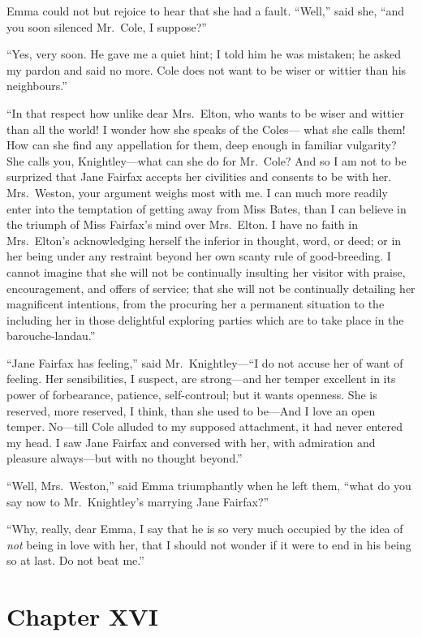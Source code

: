 Emma could not but rejoice to hear that she had a fault.
``Well,'' said she, ``and you soon silenced Mr.\ Cole, I suppose?''

``Yes, very soon.  He gave me a quiet hint; I told him he was mistaken;
he asked my pardon and said no more.  Cole does not want to be wiser
or wittier than his neighbours.''

``In that respect how unlike dear Mrs.\ Elton, who wants to be wiser
and wittier than all the world!  I wonder how she speaks of the Coles---%
what she calls them!  How can she find any appellation for them,
deep enough in familiar vulgarity?  She calls you, Knightley---what can
she do for Mr.\ Cole?  And so I am not to be surprized that Jane
Fairfax accepts her civilities and consents to be with her.
Mrs.\ Weston, your argument weighs most with me.  I can much more
readily enter into the temptation of getting away from Miss Bates,
than I can believe in the triumph of Miss Fairfax's mind over
Mrs.\ Elton.  I have no faith in Mrs.\ Elton's acknowledging herself
the inferior in thought, word, or deed; or in her being under any
restraint beyond her own scanty rule of good-breeding. I cannot
imagine that she will not be continually insulting her visitor
with praise, encouragement, and offers of service; that she will not be
continually detailing her magnificent intentions, from the procuring
her a permanent situation to the including her in those delightful
exploring parties which are to take place in the barouche-landau.''

``Jane Fairfax has feeling,'' said Mr.\ Knightley---``I do not
accuse her of want of feeling.  Her sensibilities, I suspect,
are strong---and her temper excellent in its power of forbearance,
patience, self-controul; but it wants openness.  She is reserved,
more reserved, I think, than she used to be---And I love an
open temper.  No---till Cole alluded to my supposed attachment,
it had never entered my head.  I saw Jane Fairfax and conversed with
her, with admiration and pleasure always---but with no thought beyond.''

``Well, Mrs.\ Weston,'' said Emma triumphantly when he left them,
``what do you say now to Mr.\ Knightley's marrying Jane Fairfax?''

``Why, really, dear Emma, I say that he is so very much occupied
by the idea of \emph{not} being in love with her, that I should not wonder
if it were to end in his being so at last.  Do not beat me.''



\chapter{Chapter XVI}


